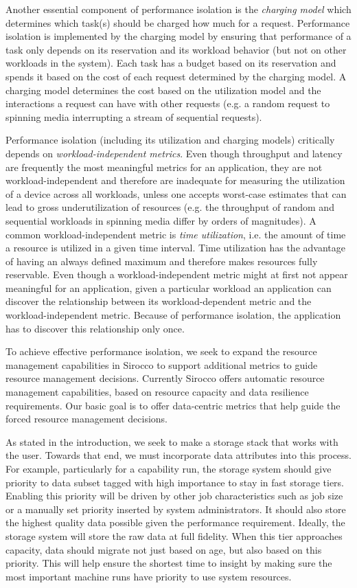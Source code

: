 Another essential component of performance isolation is the
\emph{charging model} which determines which task(s) should be
charged how much for a request. Performance isolation is implemented
by the charging model by ensuring that performance of a task only
depends on its reservation and its workload behavior (but not on
other workloads in the system). Each task has a budget based on its
reservation and spends it based on the cost of each request determined
by the charging model. A charging model determines the cost based
on the utilization model and the interactions a request can have
with other requests (e.g. a random request to spinning media
interrupting a stream of sequential requests).

Performance isolation (including its utilization and charging models)
critically depends on \emph{workload-independent metrics}. Even
though throughput and latency are frequently the most meaningful
metrics for an application, they are not workload-independent and
therefore are inadequate for measuring the utilization of a device
across all workloads, unless one accepts worst-case estimates that
can lead to gross underutilization of resources (e.g. the throughput
of random and sequential workloads in spinning media differ by
orders of magnitudes). A common workload-independent metric is
\emph{time utilization}, i.e. the amount of time a resource is
utilized in a given time interval. Time utilization has the advantage
of having an always defined maximum and therefore makes resources
fully reservable. Even though a workload-independent metric might
at first not appear meaningful for an application, given a particular
workload an application can discover the relationship between its
workload-dependent metric and the workload-independent metric.
Because of performance isolation, the application has to discover
this relationship only once.

To achieve effective performance isolation, we seek to expand the resource management
capabilities in Sirocco to support additional metrics to guide resource management
decisions. Currently Sirocco offers automatic resource management capabilities,
based on resource capacity and data resilience requirements. 
 Our basic goal is to offer data-centric metrics that help guide the
forced resource management decisions.

As stated in the introduction, we seek to make a storage stack that works with
the user. Towards that end, we must incorporate data attributes into this
process. For example, particularly for a capability run, the storage system
should give priority to data subset tagged with high importance to stay in fast
storage tiers. Enabling this priority will be driven by other job
characteristics such as job size or a manually set priority inserted by system
administrators. It should also store the highest quality data possible given
the performance requirement. Ideally, the storage system will store the raw
data at full fidelity. When this tier approaches capacity, data should migrate
not just based on age, but also based on this priority. This will help ensure
the shortest time to insight by making sure the most important machine runs
have priority to use system resources.


